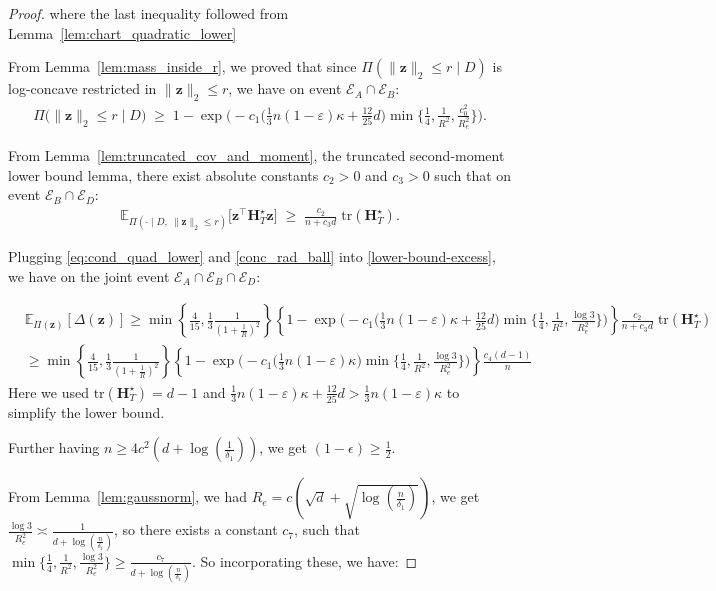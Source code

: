 \documentclass{article}
\theoremstyle{plain}
\theoremstyle{definition}
\theoremstyle{remark}
\begin{document}
{\begin{proof}
where the last inequality followed from Lemma~\ref{lem:chart_quadratic_lower}


From Lemma~\ref{lem:mass_inside_r}, we proved that since $\Pi(\|\boldsymbol z\|_2\le r\mid D)$ is log-concave restricted in $\|\mathbf{z} \|_{2} \leq r$, we have on event $\mathcal{E}_{A} \cap \mathcal{E}_{B}$:
\begin{align}
    \Pi\big(\|\mathbf z\|_2\le r\mid D\big)
\;\ge\;
1-
\exp\!\Bigg(
-c_1\Big(\tfrac{1}{3}n(1-\varepsilon)\kappa+\tfrac{12}{25}d\Big)
\min\Big\{\tfrac14,\tfrac{1}{R^2},\tfrac{c_0^2}{R_e^2}\Big\}
\Bigg).
\label{conc_rad_ball}
\end{align}

From Lemma~\ref{lem:truncated_cov_and_moment}, the truncated second-moment lower bound lemma, there exist absolute constants
$c_{2}>0$ and $c_{3}>0$ such that on event $\mathcal{E}_{B} \cap \mathcal{E}_{D}$:
\begin{align}
\mathbb E_{\Pi(\cdot\mid D,\ \|\mathbf z\|_2\le r)}\!\big[\mathbf z^\top \mathbf H_T^\star \mathbf z\big]
\;\ge\;
\frac{c_{2}}{n+c_{3}d}\;\mathrm{tr}(\mathbf H_T^\star).
\label{eq:cond_quad_lower}
\end{align}

Plugging \eqref{eq:cond_quad_lower} and \eqref{conc_rad_ball} into \eqref{lower-bound-excess}, we have on the joint event $\mathcal{E}_{A} \cap \mathcal{E}_{B} \cap \mathcal{E}_{D}:$

\begin{align}
 &    \mathbb E_{\Pi(\mathbf{z})}[\Delta(\mathbf z)] \geq \min\left\{\frac{4}{15}, \frac{1}{3} \frac{1}{(1+\frac{1}{R})^2}\right\} \left\{
1-
\exp\!\Bigg(
-c_1\Big(\tfrac{1}{3}n(1-\varepsilon)\kappa+\tfrac{12}{25}d\Big)
\min\Big\{\tfrac14,\tfrac{1}{R^2},\tfrac{\log 3}{R_e^2}\Big\}
\Bigg)
\right\}
\frac{c_{2}}{n+c_{3}d}\;\mathrm{tr}(\mathbf H_T^\star) \\
&  \geq \min\left\{\frac{4}{15}, \frac{1}{3} \frac{1}{(1+\frac{1}{R})^2}\right\}  \left\{
1-
\exp\!\Bigg(
-c_1\Big(\tfrac{1}{3}n(1-\varepsilon)\kappa\Big)
\min\Big\{\tfrac14,\tfrac{1}{R^2},\tfrac{\log 3}{R_e^2}\Big\}
\Bigg)
\right\} \frac{c_{4}(d-1)}{n} 
\end{align}
Here we used $\mathrm{tr}(\mathbf H_T^\star) = d-1$ and $\tfrac{1}{3}n(1-\varepsilon)\kappa+\tfrac{12}{25}d > \tfrac{1}{3}n(1-\varepsilon)\kappa$ to simplify the lower bound.  

Further having $n \geq 4c^2(d+\log(\frac{1}{\delta_{1}}))$, we get $(1-\epsilon)\geq \frac{1}{2}$. 

From Lemma~\ref{lem:gaussnorm}, we had $R_{e}=c(\sqrt{d} + \sqrt{\log(\frac{n}{\delta_{1}})})$, we get $\frac{\log 3}{R^2_{e}} \asymp \frac{1}{d+\log(\frac{n}{\delta_{1}})}$, so there exists a constant $c_{7}$, such that $\min\Big\{\tfrac14,\tfrac{1}{R^2},\tfrac{\log 3}{R_e^2}\Big\} \geq \frac{c_{7}}{d+\log(\frac{n}{\delta_{1}})}$. So incorporating these, we have:


\end{proof}}
\end{document}
